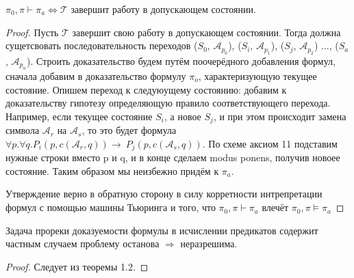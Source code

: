 \begin{theorem} 
    $\pi_0, \pi \vdash \pi_a \Longleftrightarrow \mathcal{T}$ завершит работу в допускающем состоянии.
\end{theorem} 
\begin{proof}
    Пусть $\mathcal{T}$ завершит свою работу в допускающем состоянии. Тогда должна сущетсвовать
    последовательность переходов ($S_0$, $\mathcal{A}_{p_0}$), ($S_i$, $\mathcal{A}_{p_1}$), ($S_j$,
    $\mathcal{A}_{p_2}$) $\ldots$, ($S_a$, $\mathcal{A}_{p_n}$). Строить доказательство будем путём
    поочерёдного добавления формул, сначала добавим в доказательство формулу $\pi_o$, характеризующую
    текущее состояние. Опишем переход к следуюущему состоянию: добавим к доказательству гипотезу
    определяющую правило соответствующего перехода. Например, если текущее состояние $S_i$, а новое
    $S_j$, и при этом происходит замена символа $\mathcal{A}_r$ на $\mathcal{A}_s$, то это будет формула
    $\forall p.\forall q.P_i(p, c(\mathcal{A}_r, q)) \rightarrow\ P_j(p, c(\mathcal{A}_s, q))$. По схеме
    аксиом 11 подставим нужные строки вместо p и q, и в конце сделаем modus ponens, получив новоее
    состояние. Таким образом мы неизбежно придём к $\pi_a$.
    
    Утверждение верно в обратную сторону в силу корретности интрепретации формул с помощью машины
    Тьюринга и того, что $\pi_0, \pi \vdash \pi_a$ влечёт $\pi_0, \pi \vDash \pi_a$
\end{proof}

\begin{theorem}
    Задача прореки доказуемости формулы в исчислении предикатов содержит частным случаем проблему
    останова $\Rightarrow$ неразрешима.
\end{theorem}
\begin{proof}
    Следует из теоремы 1.2.
\end{proof}

